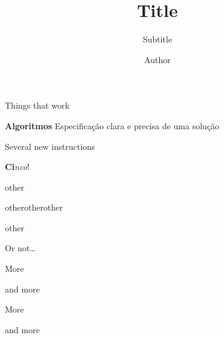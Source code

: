 \documentclass[10pt]{beamer}
\title{Title}
\subtitle{Subtitle}
\author{Author}
\begin{document}
\begin{frame}
    Things that work

    \hrulefill
    \bigskip
    \small
    \begin{mybox}[columns = auto, equal height = all]
        \item %
        \textbf{Algoritmos}\newline
        Especificação clara e precisa de uma solução
        \item Several new instructions
        \item \textbf{Ci}\textit{nco}!
        \item other
        \item other\newline other\newline other
        \item other
    \end{mybox}
    \hrulefill

    \bigskip
    Or not\ldots
\end{frame}

\begin{frame}
    \begin{mybox}[continued, columns = auto]
        \item More
        \item and more
        \item More
        \item and more
    \end{mybox}
\end{frame}
\end{document}
